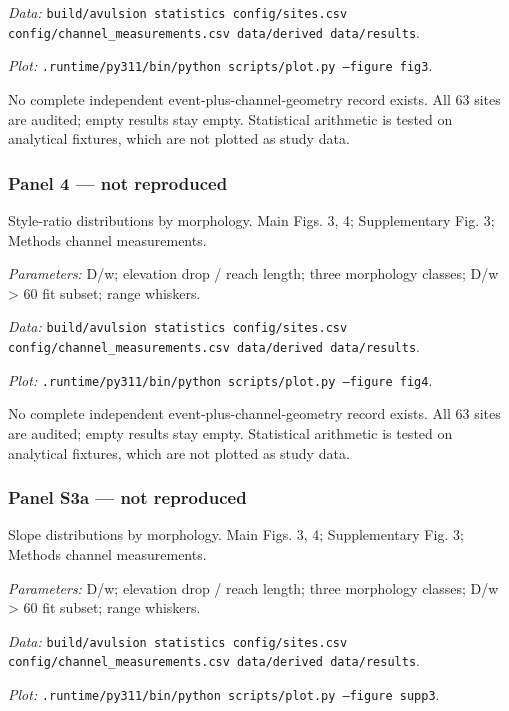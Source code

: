 \textit{Data:} \texttt{build/\allowbreak{}avulsion statistics config/\allowbreak{}sites.csv config/\allowbreak{}channel\_measurements.csv data/\allowbreak{}derived data/\allowbreak{}results}.

\textit{Plot:} \texttt{.runtime/\allowbreak{}py311/\allowbreak{}bin/\allowbreak{}python scripts/\allowbreak{}plot.py --figure fig3}.

No complete independent event-plus-channel-geometry record exists. All 63 sites are audited; empty results stay empty. Statistical arithmetic is tested on analytical fixtures, which are not plotted as study data.

\subsubsection*{Panel 4 --- not reproduced}
Style-ratio distributions by morphology. Main Figs. 3, 4; Supplementary Fig. 3; Methods channel measurements.

\textit{Parameters:} D/w; elevation drop / reach length; three morphology classes; D/w > 60 fit subset; range whiskers.

\textit{Data:} \texttt{build/\allowbreak{}avulsion statistics config/\allowbreak{}sites.csv config/\allowbreak{}channel\_measurements.csv data/\allowbreak{}derived data/\allowbreak{}results}.

\textit{Plot:} \texttt{.runtime/\allowbreak{}py311/\allowbreak{}bin/\allowbreak{}python scripts/\allowbreak{}plot.py --figure fig4}.

No complete independent event-plus-channel-geometry record exists. All 63 sites are audited; empty results stay empty. Statistical arithmetic is tested on analytical fixtures, which are not plotted as study data.

\subsubsection*{Panel S3a --- not reproduced}
Slope distributions by morphology. Main Figs. 3, 4; Supplementary Fig. 3; Methods channel measurements.

\textit{Parameters:} D/w; elevation drop / reach length; three morphology classes; D/w > 60 fit subset; range whiskers.

\textit{Data:} \texttt{build/\allowbreak{}avulsion statistics config/\allowbreak{}sites.csv config/\allowbreak{}channel\_measurements.csv data/\allowbreak{}derived data/\allowbreak{}results}.

\textit{Plot:} \texttt{.runtime/\allowbreak{}py311/\allowbreak{}bin/\allowbreak{}python scripts/\allowbreak{}plot.py --figure supp3}.

